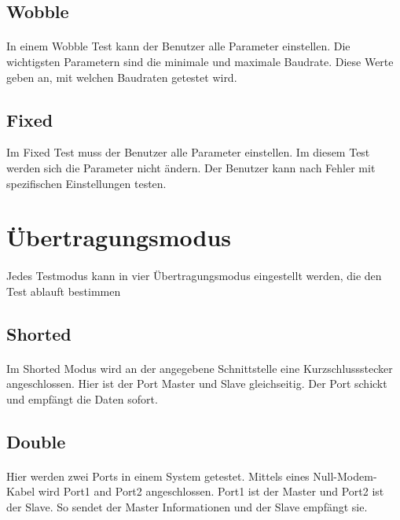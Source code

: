 \subsection{Wobble}
\paragraph{}
In einem Wobble Test kann der Benutzer alle Parameter einstellen. Die wichtigsten Parametern sind die minimale und maximale Baudrate. Diese Werte geben an, mit welchen Baudraten getestet wird.


\subsection{Fixed}
Im Fixed Test muss der Benutzer alle Parameter einstellen. Im diesem Test werden sich die Parameter nicht ändern. Der Benutzer kann nach Fehler mit spezifischen Einstellungen testen.
\paragraph{}


\section{Übertragungsmodus}
\paragraph{}
Jedes Testmodus kann in vier Übertragungsmodus eingestellt werden, die den Test ablauft bestimmen


\subsection{Shorted}
\paragraph{}
Im Shorted Modus wird an der angegebene Schnittstelle eine Kurzschlussstecker angeschlossen. Hier ist der Port Master und Slave gleichseitig. Der Port schickt und empfängt die Daten sofort.


\subsection{Double}
\paragraph{}
Hier werden zwei Ports in einem System getestet. Mittels eines Null-Modem-Kabel wird Port1 and Port2 angeschlossen. Port1 ist der Master und Port2 ist der Slave. So sendet der Master Informationen und der Slave empfängt sie.


